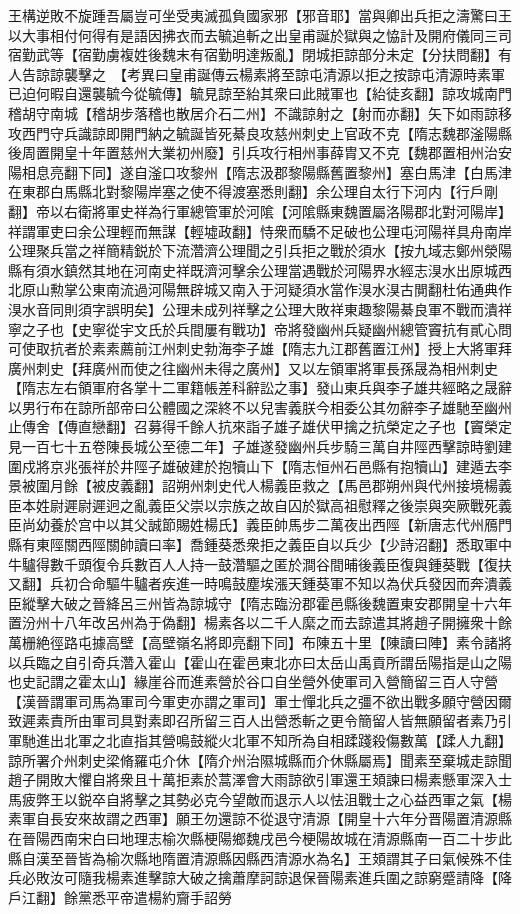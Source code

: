 王構逆敗不旋踵吾屬豈可坐受夷滅孤負國家邪【邪音耶】當與卿出兵拒之濤驚曰王以大事相付何得有是語因拂衣而去毓追斬之出皇甫誕於獄與之恊計及開府儀同三司宿勤武等【宿勤虜複姓後魏末有宿勤明達叛亂】閉城拒諒部分未定【分扶問翻】有人告諒諒襲擊之　【考異曰皇甫誕傳云楊素將至諒屯清源以拒之按諒屯清源時素軍已迫何暇自還襲毓今從毓傳】毓見諒至紿其衆曰此賊軍也【紿徒亥翻】諒攻城南門稽胡守南城【稽胡步落稽也散居介石二州】不識諒射之【射而亦翻】矢下如雨諒移攻西門守兵識諒即開門納之毓誕皆死綦良攻慈州刺史上官政不克【隋志魏郡滏陽縣後周置開皇十年置慈州大業初州廢】引兵攻行相州事薛胄又不克【魏郡置相州治安陽相息亮翻下同】遂自滏口攻黎州【隋志汲郡黎陽縣舊置黎州】塞白馬津【白馬津在東郡白馬縣北對黎陽岸塞之使不得渡塞悉則翻】余公理自太行下河内【行戶剛翻】帝以右衛將軍史祥為行軍總管軍於河隂【河隂縣東魏置屬洛陽郡北對河陽岸】祥謂軍吏曰余公理輕而無謀【輕墟政翻】恃衆而驕不足破也公理屯河陽祥具舟南岸公理聚兵當之祥簡精鋭於下流濳濟公理聞之引兵拒之戰於須水【按九域志鄭州滎陽縣有須水鎮然其地在河南史祥既濟河擊余公理當遇戰於河陽界水經志湨水出原城西北原山勲掌公東南流過河陽無辟城又南入于河疑須水當作湨水湨古閴翻杜佑通典作湨水音同則須字誤明矣】公理未成列祥擊之公理大敗祥東趣黎陽綦良軍不戰而潰祥寧之子也【史寧從宇文氏於兵間屢有戰功】帝將發幽州兵疑幽州總管竇抗有貳心問可使取抗者於素素薦前江州刺史勃海李子雄【隋志九江郡舊置江州】授上大將軍拜廣州刺史【拜廣州而使之往幽州未得之廣州】又以左領軍將軍長孫晟為相州刺史【隋志左右領軍府各掌十二軍籍帳差科辭訟之事】發山東兵與李子雄共經略之晟辭以男行布在諒所部帝曰公體國之深終不以兒害義朕今相委公其勿辭李子雄馳至幽州止傳舍【傳直戀翻】召募得千餘人抗來詣子雄子雄伏甲擒之抗榮定之子也【竇榮定見一百七十五卷陳長城公至德二年】子雄遂發幽州兵步騎三萬自井陘西擊諒時劉建圍戍將京兆張祥於井陘子雄破建於抱犢山下【隋志恒州石邑縣有抱犢山】建遁去李景被圍月餘【被皮義翻】詔朔州刺史代人楊義臣救之【馬邑郡朔州與代州接境楊義臣本姓尉遲尉遲迥之亂義臣父崇以宗族之故自囚於獄高祖慰釋之後崇與突厥戰死義臣尚幼養於宫中以其父誠節賜姓楊氏】義臣帥馬步二萬夜出西陘【新唐志代州鴈門縣有東陘關西陘關帥讀曰率】喬鍾葵悉衆拒之義臣自以兵少【少詩沼翻】悉取軍中牛驢得數千頭復令兵數百人人持一鼓濳驅之匿於澗谷間晡後義臣復與鍾葵戰【復扶又翻】兵初合命驅牛驢者疾進一時鳴鼓塵埃漲天鍾葵軍不知以為伏兵發因而奔潰義臣縱擊大破之晉絳呂三州皆為諒城守【隋志臨汾郡霍邑縣後魏置東安郡開皇十六年置汾州十八年改呂州為于偽翻】楊素各以二千人縻之而去諒遣其將趙子開擁衆十餘萬栅絶徑路屯據高壁【高壁嶺名將即亮翻下同】布陳五十里【陳讀曰陣】素令諸將以兵臨之自引奇兵濳入霍山【霍山在霍邑東北亦曰太岳山禹貢所謂岳陽指是山之陽也史記謂之霍太山】緣崖谷而進素營於谷口自坐營外使軍司入營簡留三百人守營【漢晉謂軍司馬為軍司今軍吏亦謂之軍司】軍士憚北兵之彊不欲出戰多願守營因爾致遲素責所由軍司具對素即召所留三百人出營悉斬之更令簡留人皆無願留者素乃引軍馳進出北軍之北直指其營鳴鼓縱火北軍不知所為自相蹂踐殺傷數萬【蹂人九翻】諒所署介州刺史梁脩羅屯介休【隋介州治隰城縣而介休縣屬焉】聞素至棄城走諒聞趙子開敗大懼自將衆且十萬拒素於蒿澤會大雨諒欲引軍還王頍諫曰楊素懸軍深入士馬疲弊王以鋭卒自將擊之其勢必克今望敵而退示人以怯沮戰士之心益西軍之氣【楊素軍自長安來故謂之西軍】願王勿還諒不從退守清源【開皇十六年分晋陽置清源縣在晉陽西南宋白曰地理志榆次縣梗陽鄉魏戌邑今梗陽故城在清源縣南一百二十步此縣自漢至晉皆為榆次縣地隋置清源縣因縣西清源水為名】王頍謂其子曰氣候殊不佳兵必敗汝可隨我楊素進擊諒大破之擒蕭摩訶諒退保晉陽素進兵圍之諒窮蹙請降【降戶江翻】餘黨悉平帝遣楊約齎手詔勞